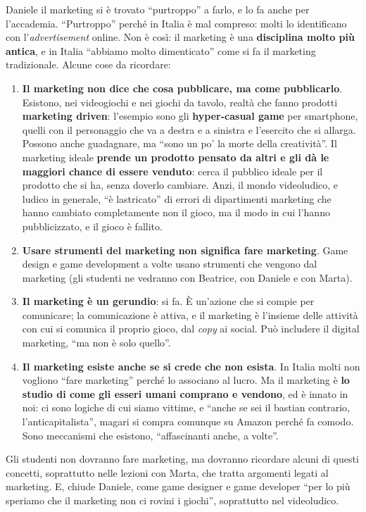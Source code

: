 Daniele il marketing si è trovato ``purtroppo'' a farlo, e lo fa anche per
l'accademia. ``Purtroppo'' perché in Italia è mal compreso: molti lo
identificano con l'\emph{advertisement} online. Non è così: il marketing è una
\textbf{disciplina molto più antica}, e in Italia ``abbiamo molto dimenticato''
come si fa il marketing tradizionale. Alcune cose da ricordare:
\begin{enumerate}
  \item \textbf{Il marketing non dice che cosa pubblicare, ma come pubblicarlo}.
        Esistono, nei videogiochi e nei giochi da tavolo, realtà che fanno
        prodotti \textbf{marketing driven}: l'esempio sono gli
        \textbf{hyper-casual game} per smartphone, quelli con il personaggio che
        va a destra e a sinistra e l'esercito che si allarga. Possono anche
        guadagnare, ma ``sono un po' la morte della creatività''. Il marketing
        ideale \textbf{prende un prodotto pensato da altri e gli dà le maggiori
        chance di essere venduto}: cerca il pubblico ideale per il prodotto che
        si ha, senza doverlo cambiare. Anzi, il mondo videoludico, e ludico in
        generale, ``è lastricato'' di errori di dipartimenti marketing che hanno
        cambiato completamente non il gioco, ma il modo in cui l'hanno
        pubblicizzato, e il gioco è fallito.
  \item \textbf{Usare strumenti del marketing non significa fare marketing}. Game
        design e game development a volte usano strumenti che vengono dal
        marketing (gli studenti ne vedranno con Beatrice, con Daniele e con
        Marta).
  \item \textbf{Il marketing è un gerundio}: si fa. È un'azione che si compie per
        comunicare; la comunicazione è attiva, e il marketing è l'insieme delle
        attività con cui si comunica il proprio gioco, dal \emph{copy} ai social.
        Può includere il digital marketing, ``ma non è solo quello''.
  \item \textbf{Il marketing esiste anche se si crede che non esista}. In Italia
        molti non vogliono ``fare marketing'' perché lo associano al lucro. Ma
        il marketing è \textbf{lo studio di come gli esseri umani comprano e
        vendono}, ed è innato in noi: ci sono logiche di cui siamo vittime, e
        ``anche se sei il bastian contrario, l'anticapitalista'', magari si
        compra comunque su Amazon perché fa comodo. Sono meccanismi che
        esistono, ``affascinanti anche, a volte''.
\end{enumerate}
Gli studenti non dovranno fare marketing, ma dovranno ricordare alcuni di questi
concetti, soprattutto nelle lezioni con Marta, che tratta argomenti legati al
marketing. E, chiude Daniele, come game designer e game developer ``per lo più
speriamo che il marketing non ci rovini i giochi'', soprattutto nel videoludico.


